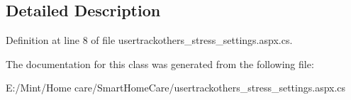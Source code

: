\subsection{Detailed Description}


Definition at line 8 of file usertrackothers\-\_\-stress\-\_\-settings.\-aspx.\-cs.



The documentation for this class was generated from the following file\-:\begin{DoxyCompactItemize}
\item 
E\-:/\-Mint/\-Home care/\-Smart\-Home\-Care/usertrackothers\-\_\-stress\-\_\-settings.\-aspx.\-cs\end{DoxyCompactItemize}
